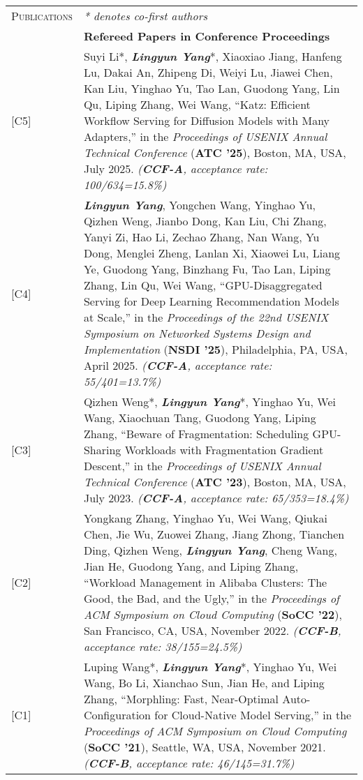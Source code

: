 \documentclass[letterpaper, 12pt]{article}
\begin{document}
\begin{longtable}{p{1.0in}p{5.8in}}
\nohyphens{\textsc{Publications}}
& \textit{* denotes co-first authors} \\

& \textbf{Refereed Papers in Conference Proceedings} \\
\hfill [C5]
& Suyi Li*, \textbf{\emph{Lingyun Yang}}*, Xiaoxiao Jiang, Hanfeng Lu, Dakai An, Zhipeng Di, Weiyi Lu, Jiawei Chen, Kan Liu, Yinghao Yu, Tao Lan, Guodong Yang, Lin Qu, Liping Zhang, Wei Wang, “Katz: Efficient Workflow Serving for Diffusion Models with Many Adapters,” in the \textit{Proceedings of USENIX Annual Technical Conference} (\textbf{ATC '25}), Boston, MA, USA, July 2025. \textit{(\textbf{CCF-A}, acceptance rate: 100/634=15.8\%)} \\
\hfill [C4]
& \textbf{\emph{Lingyun Yang}}, Yongchen Wang, Yinghao Yu, Qizhen Weng, Jianbo Dong, Kan Liu, Chi Zhang, Yanyi Zi, Hao Li, Zechao Zhang, Nan Wang, Yu Dong, Menglei Zheng, Lanlan Xi, Xiaowei Lu, Liang Ye, Guodong Yang, Binzhang Fu, Tao Lan, Liping Zhang, Lin Qu, Wei Wang, “GPU-Disaggregated Serving for Deep Learning Recommendation Models at Scale,” in the \textit{Proceedings of the 22nd USENIX Symposium on Networked Systems Design and Implementation} (\textbf{NSDI '25}), Philadelphia, PA, USA, April 2025. \textit{(\textbf{CCF-A}, acceptance rate: 55/401=13.7\%)} \\
\hfill [C3]
& Qizhen Weng*, \textbf{\emph{Lingyun Yang}}*, Yinghao Yu, Wei Wang, Xiaochuan Tang, Guodong Yang, Liping Zhang, “Beware of Fragmentation: Scheduling GPU-Sharing Workloads with Fragmentation Gradient Descent,” in the \textit{Proceedings of USENIX Annual Technical Conference} (\textbf{ATC '23}), Boston, MA, USA, July 2023. \textit{(\textbf{CCF-A}, acceptance rate: 65/353=18.4\%)} \\
\hfill [C2]
& Yongkang Zhang, Yinghao Yu, Wei Wang, Qiukai Chen, Jie Wu, Zuowei Zhang, Jiang Zhong, Tianchen Ding, Qizhen Weng, \textbf{\emph{Lingyun Yang}}, Cheng Wang, Jian He, Guodong Yang, and Liping Zhang, “Workload Management in Alibaba Clusters: The Good, the Bad, and the Ugly,” in the \textit{Proceedings of ACM Symposium on Cloud Computing} (\textbf{SoCC '22}), San Francisco, CA, USA, November 2022. \textit{(\textbf{CCF-B}, acceptance rate: 38/155=24.5\%)} \\
\hfill [C1]
& Luping Wang*, \textbf{\emph{Lingyun Yang}}*, Yinghao Yu, Wei Wang, Bo Li, Xianchao Sun, Jian He, and Liping Zhang, “Morphling: Fast, Near-Optimal Auto-Configuration for Cloud-Native Model Serving,” in the \textit{Proceedings of ACM Symposium on Cloud Computing} (\textbf{SoCC '21}), Seattle, WA, USA, November 2021. \textit{(\textbf{CCF-B}, acceptance rate: 46/145=31.7\%)} \\


\end{longtable}
\end{document}
